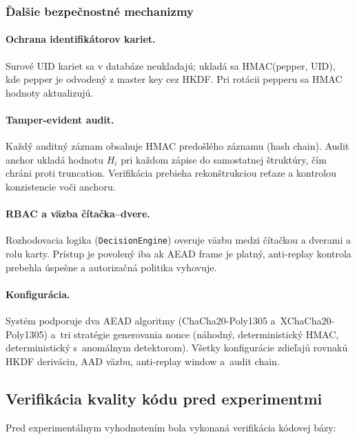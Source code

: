 \subsubsection{Ďalšie bezpečnostné mechanizmy}

\paragraph{Ochrana identifikátorov kariet.} Surové UID kariet sa v databáze neukladajú; ukladá sa HMAC(pepper, UID), kde pepper je odvodený z master key cez HKDF. Pri rotácii pepperu sa HMAC hodnoty aktualizujú.

\paragraph{Tamper-evident audit.} Každý auditný záznam obsahuje HMAC predošlého záznamu (hash chain). Audit anchor ukladá hodnotu $H_i$ pri každom zápise do samostatnej štruktúry, čím chráni proti truncation. Verifikácia prebieha rekonštrukciou reťaze a kontrolou konzistencie voči anchoru\cite{SchneierKelsey1999}.

\paragraph{RBAC a väzba čítačka--dvere.} Rozhodovacia logika (\texttt{DecisionEngine}) overuje väzbu medzi čítačkou a dverami a rolu karty. Prístup je povolený iba ak AEAD frame je platný, anti-replay kontrola prebehla úspešne a autorizačná politika vyhovuje.

\paragraph{Konfigurácia.} Systém podporuje dva AEAD algoritmy (ChaCha20-Poly1305 a~XChaCha20-Poly1305) a~tri stratégie generovania nonce (náhodný, deterministický HMAC, deterministický s~anomálnym detektorom). Všetky konfigurácie zdieľajú rovnakú HKDF deriváciu, AAD väzbu, anti-replay window a~audit chain.


\subsection{Verifikácia kvality kódu pred experimentmi}

Pred experimentálnym vyhodnotením bola vykonaná verifikácia kódovej bázy:

